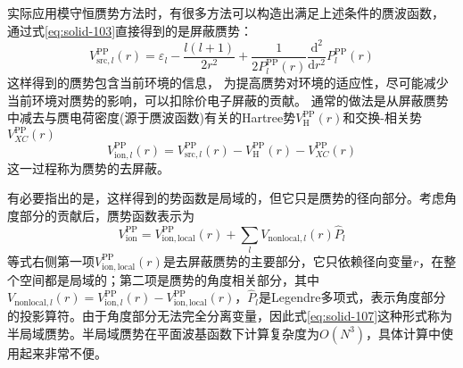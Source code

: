 实际应用模守恒赝势方法时，有很多方法可以构造出满足上述条件的赝波函数\cite{PRB18-5449_1978,PRB26-4199_1982,PRL43-1494_1979,JPC13-L189_1980,PRB32-8412_1985,PRB43-1993_1991}，%
通过式\eqref{eq:solid-103}直接得到的是屏蔽赝势：
\begin{equation}
	V_{\mathrm{src},l}^{\mathrm{PP}}(r)=\varepsilon_l-\frac{l(l+1)}{2r^2}+\frac1{2P_l^{\mathrm{PP}}(r)}\frac{\mathrm{d}^2}{\mathrm{d}r^2}P_l^{\mathrm{PP}}(r)
  \label{eq:solid-106}
\end{equation}
这样得到的赝势包含当前环境的信息，%
为提高赝势对环境的适应性，尽可能减少当前环境对赝势的影响，可以扣除价电子屏蔽的贡献。%
通常的做法是从屏蔽赝势中减去与赝电荷密度(源于赝波函数)有关的Hartree势$V_{\mathrm{H}}^{\mathrm{PP}}(r)$和交换-相关势$V_{XC}^{\mathrm{PP}}(r)$%
$$V_{\mathrm{ion},l}^{\mathrm{PP}}(r)=V_{\mathrm{src},l}^{\mathrm{PP}}(r)-V_{\mathrm{H}}^{\mathrm{PP}}(r)-V_{XC}^{\mathrm{PP}}(r)$$
这一过程称为赝势的去屏蔽。

有必要指出的是，这样得到的势函数是局域的，但它只是赝势的径向部分。考虑角度部分的贡献后，赝势函数表示为
\begin{equation}
	V_{\mathrm{ion}}^{\mathrm{PP}}=V_{\mathrm{ion},\mathrm{local}}^{\mathrm{PP}}(r)+\sum_lV_{\mathrm{nonlocal},l}(r)\hat P_l
  \label{eq:solid-107}
\end{equation}
等式右侧第一项$V_{\mathrm{ion},\mathrm{local}}^{\mathrm{PP}}(r)$是去屏蔽赝势的主要部分，它只依赖径向变量$r$，在整个空间都是局域的；第二项是赝势的角度相关部分，其中$V_{\mathrm{nonlocal},l}(r)=V_{\mathrm{ion},l}^{\mathrm{PP}}(r)-V_{\mathrm{ion},\mathrm{local}}^{\mathrm{PP}}(r)$，$\hat P_l$是Legendre多项式，表示角度部分的投影算符。由于角度部分无法完全分离变量，因此式\eqref{eq:solid-107}这种形式称为半局域赝势。半局域赝势在平面波基函数下计算复杂度为$O(N^3)$，具体计算中使用起来非常不便。


